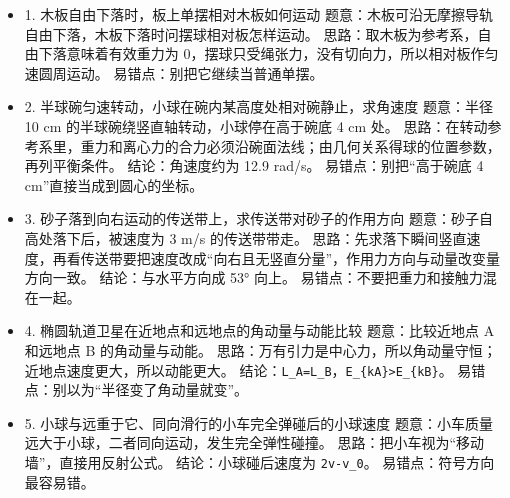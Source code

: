 \documentclass[12pt,a4paper]{ctexart}
\begin{document}
\begin{itemize}

\item 1. 木板自由下落时，板上单摆相对木板如何运动 题意：木板可沿无摩擦导轨自由下落，木板下落时问摆球相对板怎样运动。 思路：取木板为参考系，自由下落意味着有效重力为 0，摆球只受绳张力，没有切向力，所以相对板作匀速圆周运动。 易错点：别把它继续当普通单摆。

\end{itemize}

\begin{itemize}

\item 2. 半球碗匀速转动，小球在碗内某高度处相对碗静止，求角速度 题意：半径 10 cm 的半球碗绕竖直轴转动，小球停在高于碗底 4 cm 处。 思路：在转动参考系里，重力和离心力的合力必须沿碗面法线；由几何关系得球的位置参数，再列平衡条件。 结论：角速度约为 12.9 rad/s。 易错点：别把“高于碗底 4 cm”直接当成到圆心的坐标。

\end{itemize}

\begin{itemize}

\item 3. 砂子落到向右运动的传送带上，求传送带对砂子的作用方向 题意：砂子自高处落下后，被速度为 3 m/s 的传送带带走。 思路：先求落下瞬间竖直速度，再看传送带要把速度改成“向右且无竖直分量”，作用力方向与动量改变量方向一致。 结论：与水平方向成 53° 向上。 易错点：不要把重力和接触力混在一起。

\end{itemize}

\begin{itemize}

\item 4. 椭圆轨道卫星在近地点和远地点的角动量与动能比较 题意：比较近地点 A 和远地点 B 的角动量与动能。 思路：万有引力是中心力，所以角动量守恒；近地点速度更大，所以动能更大。 结论：\texttt{L\_A=L\_B}，\texttt{E\_\{kA\}>E\_\{kB\}}。 易错点：别以为“半径变了角动量就变”。

\end{itemize}

\begin{itemize}

\item 5. 小球与远重于它、同向滑行的小车完全弹碰后的小球速度 题意：小车质量远大于小球，二者同向运动，发生完全弹性碰撞。 思路：把小车视为“移动墙”，直接用反射公式。 结论：小球碰后速度为 \texttt{2v-v\_0}。 易错点：符号方向最容易错。

\end{itemize}
\end{document}
